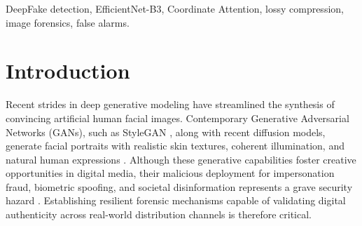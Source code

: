 \documentclass[conference]{IEEEtran}
\begin{document}
\begin{abstract}
Recent leaps in synthetic media generation permit the automated production of deceptively lifelike facial manipulations, posing severe threats to digital media verification. While baseline Convolutional Neural Network (CNN) architectures, notably EfficientNet-B3, attain strong discriminative accuracy on uncompressed images, their detection efficacy degrades severely under social media transcoding. Lossy transmission pipelines introduce Discrete Cosine Transform (DCT) quantization noise that obscures subtle synthesis artifacts while introducing deceptive block-boundary patterns. To overcome this limitation, this paper introduces Coord-EfficientNet-B3, a forensic architecture combining directional Coordinate Attention (CoordAtt) with stochastic compression-aware training. By decomposing spatial pooling into orthogonal horizontal and vertical coordinate projections, the model preserves position-sensitive forgery traces while exhibiting resilience against isotropic compression noise. Evaluated across 12,000 multi-condition inferences over diverse Quality Factor (QF) tiers, Coord-EfficientNet-B3 reduces aggregate classification errors by 14.4\% and suppresses false alarms by 24.2\% relative to the standard baseline ($p = 0.00116$, McNemar test). Across an untouched holdout set of 200 facial portraits, the architecture decreases net errors by 49.1\% and halves missed deepfakes at canonical threshold $\tau = 0.50$.
\end{abstract}

\begin{IEEEkeywords}
DeepFake detection, EfficientNet-B3, Coordinate Attention, lossy compression, image forensics, false alarms.
\end{IEEEkeywords}

\section{Introduction}
Recent strides in deep generative modeling have streamlined the synthesis of convincing artificial human facial images. Contemporary Generative Adversarial Networks (GANs), such as StyleGAN \cite{karras2019style}, along with recent diffusion models, generate facial portraits with realistic skin textures, coherent illumination, and natural human expressions \cite{goodfellow2014generative}. Although these generative capabilities foster creative opportunities in digital media, their malicious deployment for impersonation fraud, biometric spoofing, and societal disinformation represents a grave security hazard \cite{mirsky2021creation}. Establishing resilient forensic mechanisms capable of validating digital authenticity across real-world distribution channels is therefore critical.
\end{document}
